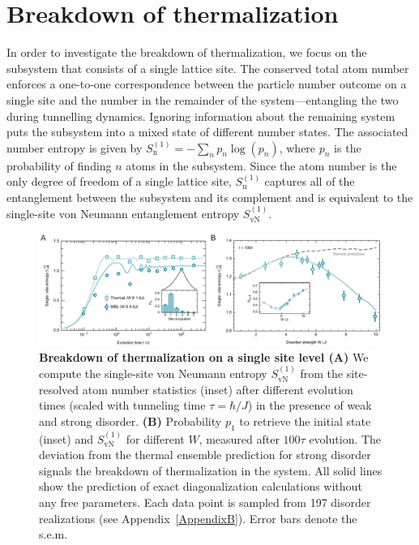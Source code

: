 \section{Breakdown of thermalization}

In order to investigate the breakdown of thermalization, we focus on the subsystem that consists of a single lattice site. The conserved total atom number enforces a one-to-one correspondence between the particle number outcome on a single site and the number in the remainder of the system---entangling the two during tunnelling dynamics. Ignoring information about the remaining system puts the subsystem into a mixed state of different number states. The associated number entropy is given by $S_\text{n}^{(1)} = -\sum_{n} p_n \log(p_n)$, where $p_n$ is the probability of finding $n$ atoms in the subsystem. Since the atom number is the only degree of freedom of a single lattice site, $S_\text{n}^{(1)}$ captures all of the entanglement between the subsystem and its complement and is equivalent to the single-site von Neumann entanglement entropy $S_\text{vN}^{(1)}$.

\begin{figure}[t]
	\centering
	\includegraphics[width=\textwidth]{figures/MBL_ETH_breakdown.pdf}
	{\caption{{\bf Breakdown of thermalization on a single site level (A)} We compute the single-site von Neumann entropy $S_\text{vN}^{(1)}$ from the site-resolved atom number statistics (inset) after different evolution times (scaled with tunneling time $\tau=\hbar/J$) in the presence of weak and strong disorder. {\bf(B)} Probability $p_1$ to retrieve the initial state (inset) and $S_\text{vN}^{(1)}$ for different $W$, measured after $100\tau$ evolution. The deviation from the thermal ensemble prediction for strong disorder signals the breakdown of thermalization in the system. All solid lines show the prediction of exact diagonalization calculations without any free parameters. Each data point is sampled from 197 disorder realizations (see Appendix~\ref{AppendixB}). Error bars denote the s.e.m.}
	\label{fig:MBL_ETH_breakdown}}
\end{figure}

